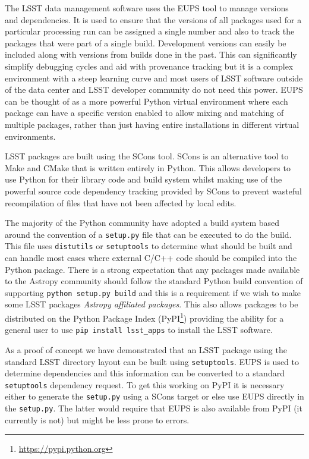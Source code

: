 \documentclass[]{spie}  %
\begin{document}
\label{sec:packaging}

The LSST data management software uses the EUPS tool\cite{EUPS} to manage versions and dependencies.
It is used to ensure that the versions of all packages used for a particular processing run can be assigned a single number and also to track the packages that were part of a single build.
Development versions can easily be included along with versions from builds done in the past.
This can significantly simplify debugging cycles and aid with provenance tracking but it is a complex environment with a steep learning curve and most users of LSST software outside of the data center and LSST developer community do not need this power.
EUPS can be thought of as a more powerful Python virtual environment where each package can have a specific version enabled to allow mixing and matching of multiple packages, rather than just having entire installations in different virtual environments.

LSST packages are built using the SCons tool\cite{2005Scons1377085}.
SCons is an alternative tool to Make and CMake that is written entirely in Python.
This allows developers to use Python for their library code and build system whilst making use of the powerful source code dependency tracking provided by SCons to prevent wasteful recompilation of files that have not been affected by local edits.

The majority of the Python community have adopted a build system based around the convention of a \texttt{setup.py} file that can be executed to do the build.
This file uses \texttt{distutils} or \texttt{setuptools} to determine what should be built and can handle most cases where external C/C++ code should be compiled into the Python package.
There is a strong expectation that any packages made available to the Astropy community should follow the standard Python build convention of supporting \texttt{python setup.py build} and this is a requirement if we wish to make some LSST packages \emph{Astropy affiliated packages}.
This also allows packages to be distributed on the Python Package Index (PyPI\footnote{\url{https://pypi.python.org}}) providing the ability for a general user to use \texttt{pip install lsst\_apps} to install the LSST software.

As a proof of concept we have demonstrated that an LSST package using the standard LSST directory layout can be built using \texttt{setuptools}.
EUPS is used to determine dependencies and this information can be converted to a standard \texttt{setuptools} dependency request.
To get this working on PyPI it is necessary either to generate the \texttt{setup.py} using a SCons target or else use EUPS directly in the \texttt{setup.py}.
The latter would require that EUPS is also available from PyPI (it currently is not) but might be less prone to errors.
\end{document}
